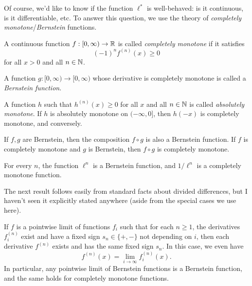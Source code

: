 \documentclass[letterpaper,11pt]{article}
\begin{document}
Of course, we'd like to know if the function $\ell^*$ is well-behaved: is it continuous, is it differentiable, etc. To answer this question, we use the theory of \emph{completely monotone}/\emph{Bernstein} functions.

\begin{defn} A continuous function $f : [0,\infty) \rightarrow \mathbb{R}$ is called \emph{completely monotone} if it satisfies
\[
(-1)^nf^{(n)}(x) \ge 0
\]
for all $x > 0$ and all $n \in \mathbb{N}$.

A function $g : [0,\infty) \rightarrow [0,\infty)$ whose derivative is completely monotone is called a \emph{Bernstein function}.

A function $h$ such that $h^{(n)}(x) \ge 0$ for all $x$ and all $n \in \mathbb{N}$ is called \emph{absolutely monotone}. If $h$ is absolutely monotone on $(-\infty, 0]$, then $h(-x)$ is completely monotone, and conversely.
\end{defn}

\begin{prop} If $f,g$ are Bernstein, then the composition $f \circ g$ is also a Bernstein function. If $f$ is completely monotone and $g$ is Bernstein, then $f \circ g$ is completely monotone.
\end{prop}

\begin{cor} For every $n$, the function $\ell^n$ is a Bernstein function, and $1/\ell^n$ is a completely monotone function.
\end{cor}

The next result follows easily from standard facts about divided differences, but I haven't seen it explicitly stated anywhere (aside from the special cases we use here).

\begin{prop} If $f$ is a pointwise limit of functions $f_i$ such that for each $n \ge 1$, the derivatives $f_i^{(n)}$ exist and have a fixed sign $s_n \in \{+,-\}$ not depending on $i$, then each derivative $f^{(n)}$ exists and has the same fixed sign $s_n$. In this case, we even have
\[
f^{(n)}(x) = \lim_{i\rightarrow \infty} f_i^{(n)}(x).
\]
In particular, any pointwise limit of Bernstein functions is a Bernstein function, and the same holds for completely monotone functions.
\end{prop}

\end{document}
